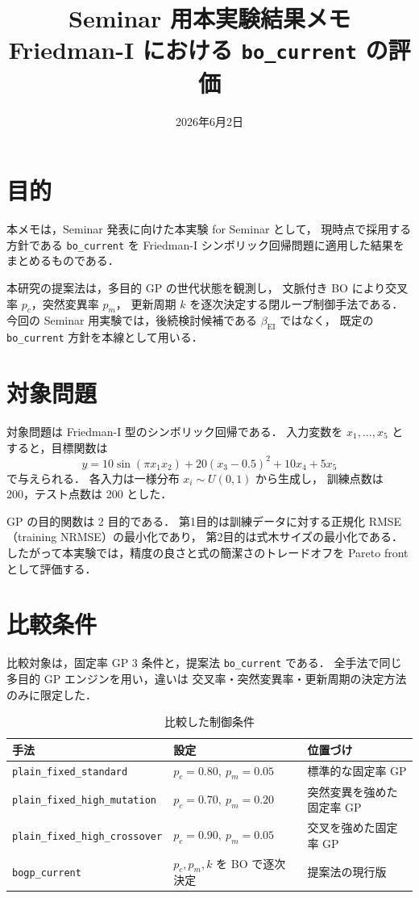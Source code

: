 \documentclass[a4paper,11pt]{ltjsarticle}
\title{Seminar 用本実験結果メモ\\
\large Friedman-I における \texttt{bo\_current} の評価}
\author{}
\date{2026年6月2日}
\begin{document}
\maketitle

\section{目的}

本メモは，Seminar 発表に向けた本実験 for Seminar として，
現時点で採用する方針である \texttt{bo\_current} を
Friedman-I シンボリック回帰問題に適用した結果をまとめるものである．

本研究の提案法は，多目的 GP の世代状態を観測し，
文脈付き BO により交叉率 \(p_c\)，突然変異率 \(p_m\)，
更新周期 \(k\) を逐次決定する閉ループ制御手法である．
今回の Seminar 用実験では，後続検討候補である
\(\beta_{\mathrm{EI}}\) ではなく，
既定の \texttt{bo\_current} 方針を本線として用いる．

\section{対象問題}

対象問題は Friedman-I 型のシンボリック回帰である．
入力変数を \(x_1,\ldots,x_5\) とすると，目標関数は
\[
  y =
  10\sin(\pi x_1 x_2)
  +20(x_3-0.5)^2
  +10x_4
  +5x_5
\]
で与えられる．
各入力は一様分布 \(x_i\sim U(0,1)\) から生成し，
訓練点数は 200，テスト点数は 200 とした．

GP の目的関数は 2 目的である．
第1目的は訓練データに対する正規化 RMSE
（training NRMSE）の最小化であり，
第2目的は式木サイズの最小化である．
したがって本実験では，精度の良さと式の簡潔さのトレードオフを
Pareto front として評価する．

\section{比較条件}

比較対象は，固定率 GP 3 条件と，提案法 \texttt{bo\_current} である．
全手法で同じ多目的 GP エンジンを用い，違いは
交叉率・突然変異率・更新周期の決定方法のみに限定した．

\begin{table}[htbp]
\centering
\caption{比較した制御条件}
\begin{tabular}{lll}
\toprule
手法 & 設定 & 位置づけ \\
\midrule
\texttt{plain\_fixed\_standard}
& \(p_c=0.80,\ p_m=0.05\)
& 標準的な固定率 GP \\
\texttt{plain\_fixed\_high\_mutation}
& \(p_c=0.70,\ p_m=0.20\)
& 突然変異を強めた固定率 GP \\
\texttt{plain\_fixed\_high\_crossover}
& \(p_c=0.90,\ p_m=0.05\)
& 交叉を強めた固定率 GP \\
\texttt{bogp\_current}
& \(p_c,p_m,k\) を BO で逐次決定
& 提案法の現行版 \\
\bottomrule
\end{tabular}
\end{table}
\end{document}
